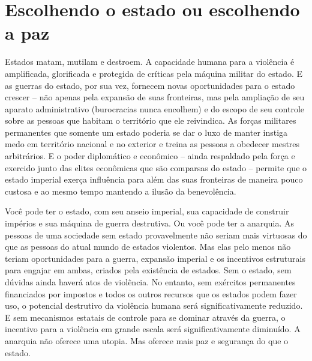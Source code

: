 \section{Escolhendo o estado ou escolhendo a paz}

Estados matam, mutilam e destroem. A capacidade humana para a violência é amplificada, glorificada e protegida de críticas pela máquina militar do estado. E as guerras do estado, por sua vez, fornecem novas oportunidades para o estado crescer -- não apenas pela expansão de suas fronteiras, mas pela ampliação de seu aparato administrativo (burocracias nunca encolhem) e do escopo de seu controle sobre as pessoas que habitam o território que ele reivindica. As forças militares permanentes que somente um estado poderia se dar o luxo de manter instiga medo em território nacional e no exterior e treina as pessoas a obedecer mestres arbitrários. E o poder diplomático e econômico -- ainda respaldado pela força e exercido junto das elites econômicas que são comparsas do estado -- permite que o estado imperial exerça influência para além das suas fronteiras de maneira pouco custosa e ao mesmo tempo mantendo a ilusão da benevolência.

Você pode ter o estado, com seu anseio imperial, sua capacidade de construir impérios e sua máquina de guerra destrutiva. Ou você pode ter a anarquia. As pessoas de uma sociedade sem estado provavelmente não seriam mais virtuosas do que as pessoas do atual mundo de estados violentos. Mas elas pelo menos não teriam oportunidades para a guerra, expansão imperial e os incentivos estruturais para engajar em ambas, criados pela existência de estados. Sem o estado, sem dúvidas ainda haverá atos de violência. No entanto, sem exércitos permanentes financiados por impostos e todos os outros recursos que os estados podem fazer uso, o potencial destrutivo da violência humana será significativamente reduzido. E sem mecanismos estatais de controle para se dominar através da guerra, o incentivo para a violência em grande escala será significativamente diminuído. A anarquia não oferece uma utopia. Mas oferece mais paz e segurança do que o estado.